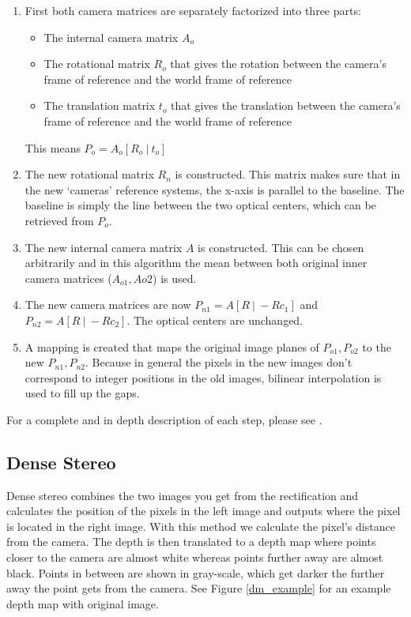 \documentclass[a4paper]{article}
\begin{document}
\begin{enumerate}
  \item First both camera matrices are separately factorized into three parts:
  \begin{itemize}
    \item The internal camera matrix $A_o$
    \item The rotational matrix $R_o$ that gives the rotation between the camera's
    frame of reference and the world frame of reference
    \item The translation matrix $t_o$ that gives the translation between the
    camera's frame of reference and the world frame of reference
  \end{itemize}
  This means $P_o = A_o[R_o\ |\ t_o]$
  \item The new rotational matrix $R_n$ is constructed. This matrix makes
  sure that in the new `cameras' reference systems, the x-axis is parallel
  to the baseline. The baseline is simply the line between the two optical
  centers, which can be retrieved from $P_o$.
  \item The new internal camera matrix $A$ is constructed. This can be
  chosen arbitrarily and in this algorithm the mean between both original
  inner camera matrices ($A_{o1}, A{o2}$) is used.
  \item The new camera matrices are now $P_{n1} = A[R\ |\ -R c_1]$ and
  $P_{n2}
  = A[R\ |\ -R c_2]$. The optical centers are unchanged.
  \item A mapping is created that maps the original image planes of $P_{o1},
  P_{o2}$ to the new $P_{n1}, P_{n2}$. Because in general the pixels in the new
  images don't correspond to integer positions in the old images, bilinear
  interpolation is used to fill up the gaps.
\end{enumerate}

For a complete and in depth description of each step, please see
\cite{fusiello2000}.

\subsection{Dense Stereo} 
Dense stereo combines the two images you get from the rectification
and calculates the position of the pixels in the left image and
outputs where the pixel is located in the right image. With this
method we calculate the pixel's distance from the camera.  The depth
is then translated to a depth map where points closer to the camera
are almost white whereas points further away are almost black. Points
in between are shown in gray-scale, which get darker the further away
the point gets from the camera. See Figure \ref{dm_example} for an
example depth map with original image.
\end{document}
